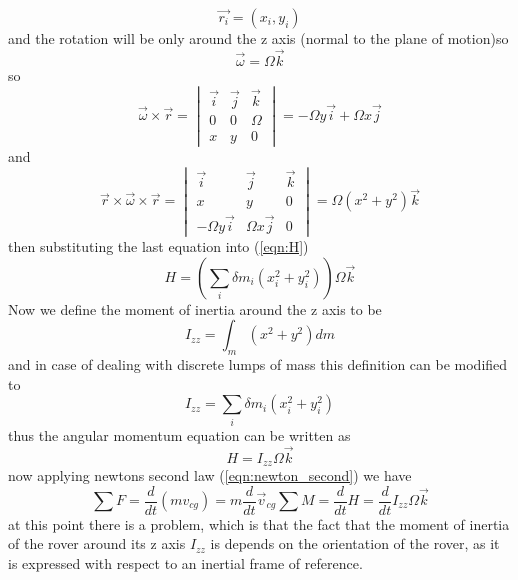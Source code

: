 \documentclass{article}
\begin{document}
	\[\vec{r_i} = \left(x_i,y_i\right)
	\]
	and the rotation will be only around the z axis (normal to the plane of motion)so
	\[\vec{\omega} = \Omega \vec{k}
	\]
	so 
	\begin{equation*}
	\vec{\omega}\times\vec{r} = \begin{vmatrix}
	\vec{i} & \vec{j} & \vec{k}\\0 & 0 & \Omega\\x& y& 0
	\end{vmatrix} = -\Omega y\vec{i} + \Omega x\vec{j}
	\end{equation*}
	and
	\begin{equation*}
	\vec{r}\times\vec{\omega}\times\vec{r} = \begin{vmatrix}
	\vec{i} & \vec{j} & \vec{k}\\x& y& 0\\-\Omega y\vec{i} & \Omega x\vec{j} & 0
	\end{vmatrix} = \Omega\left(x^2+y^2\right)\vec{k}
	\end{equation*}
	then substituting the last equation into (\ref{eqn:H})
	\begin{equation}
	H = \left(\sum_{i}\delta m_i(x_{i}^{2}+y_{i}^{2})\right)\Omega\vec{k}
	\end{equation}
	Now we define the moment of inertia around the z axis to be
	\begin{equation*}
	I_{zz} = \int_{m}(x^2 + y^2)dm
	\end{equation*}
	and in case of dealing with discrete lumps of mass this definition can be modified to 
	\begin{equation*}
	I_{zz} = \sum_{i}\delta m_i(x_{i}^{2}+y_{i}^{2})
	\end{equation*}
	thus the angular momentum equation can be written as
	\begin{equation}
	H = I_{zz}\Omega \vec{k}
	\end{equation}
	now applying newtons second law (\ref{eqn:newton_second}) we have
	\begin{subequations}
	\begin{equation}
	\sum F = \frac{d}{dt}\left(mv_{cg}\right) = m\frac{d}{dt}\vec{v}_{cg}
	\end{equation}
	\begin{equation}
	\sum M = \frac{d}{dt}H = \frac{d}{dt}I_{zz}\Omega\vec{k}
	\end{equation}
	\end{subequations}
	at this point there is a problem, which is that the fact that the moment of inertia of the rover around its z axis $I_{zz}$ is depends on the orientation of the rover, as it is expressed with respect to an inertial frame of reference.
\end{document}

